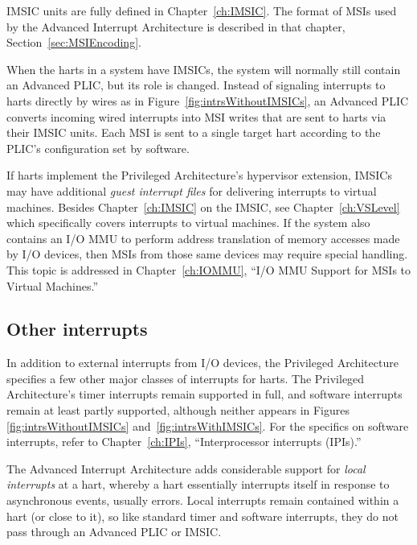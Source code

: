 IMSIC units are fully defined in Chapter~\ref{ch:IMSIC}.
The format of MSIs used by the {\RISCV} Advanced Interrupt Architecture
is described in that chapter, Section~\ref{sec:MSIEncoding}.

When the harts in a {\RISCV} system have IMSICs, the system will
normally still contain an Advanced PLIC, but its role is changed.
Instead of signaling interrupts to harts directly by wires as in
Figure~\ref{fig:intrsWithoutIMSICs}, an Advanced PLIC converts incoming
wired interrupts into MSI writes that are sent to harts via their IMSIC
units.
Each MSI is sent to a single target hart according to the PLIC's
configuration set by software.

If {\RISCV} harts implement the Privileged Architecture's hypervisor
extension, IMSICs may have additional \emph{guest interrupt files} for
delivering interrupts to virtual machines.
Besides Chapter~\ref{ch:IMSIC} on the IMSIC, see
Chapter~\ref{ch:VSLevel} which specifically covers interrupts to
virtual machines.
If the system also contains an I/O MMU to perform address translation
of memory accesses made by I/O devices, then MSIs from those same
devices may require special handling.
This topic is addressed in Chapter~\ref{ch:IOMMU}, ``I/O MMU Support
for MSIs to Virtual Machines.''

\subsection{Other interrupts}

In addition to external interrupts from I/O devices, the {\RISCV}
Privileged Architecture specifies a few other major classes of
interrupts for harts.
The Privileged Architecture's timer interrupts remain supported
in full, and software interrupts remain at least partly supported,
although neither appears in Figures \ref{fig:intrsWithoutIMSICs}
and~\ref{fig:intrsWithIMSICs}.
For the specifics on software interrupts, refer to
Chapter~\ref{ch:IPIs}, ``Interprocessor interrupts (IPIs).''

The Advanced Interrupt Architecture adds considerable support
for \emph{local interrupts} at a hart, whereby a hart essentially
interrupts itself in response to asynchronous events, usually errors.
Local interrupts remain contained within a hart (or close to it),
so like standard {\RISCV} timer and software interrupts, they do not
pass through an Advanced PLIC or IMSIC.

